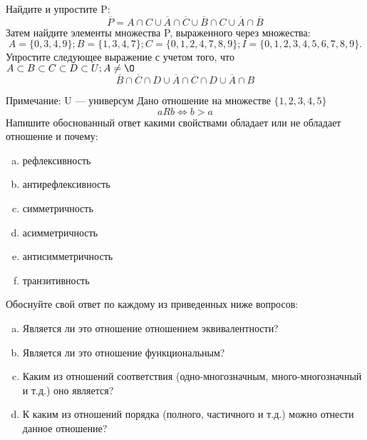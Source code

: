 \documentclass[10pt]{exam}
\begin{document}
\begin{questions}
\question
Найдите и упростите P:
\begin{equation*}
\overline{P} = A \cap C \cup \overline{A} \cap \overline{C} \cup \overline{B} \cap C \cup \overline{A} \cap \overline{B}
\end{equation*}
Затем найдите элементы множества P, выраженного через множества:
\begin{equation*}
A = \{0, 3, 4, 9\}; 
B = \{1, 3, 4, 7\};
C = \{0, 1, 2, 4, 7, 8, 9\};
I = \{0, 1, 2, 3, 4, 5, 6, 7, 8, 9\}.
\end{equation*}\question
Упростите следующее выражение с учетом того, что $A\subset B \subset C \subset D \subset U; A \neq \O$
\begin{equation*}
\overline{B} \cap \overline{C} \cap D \cup \overline{A} \cap \overline{C} \cap D \cup \overline{A} \cap B
\end{equation*}

Примечание: U — универсум\question
Дано отношение на множестве $\{1, 2, 3, 4, 5\}$ 
\begin{equation*}
aRb \iff b > a
\end{equation*}
Напишите обоснованный ответ какими свойствами обладает или не обладает отношение и почему:   
\begin{enumerate} [a)]\setcounter{enumi}{0}
\item рефлексивность
\item антирефлексивность
\item симметричность
\item асимметричность
\item антисимметричность
\item транзитивность
\end{enumerate}

Обоснуйте свой ответ по каждому из приведенных ниже вопросов:
\begin{enumerate} [a)]\setcounter{enumi}{0}
    \item Является ли это отношение отношением эквивалентности?
    \item Является ли это отношение функциональным?
    \item Каким из отношений соответствия (одно-многозначным, много-многозначный и т.д.) оно является?
    \item К каким из отношений порядка (полного, частичного и т.д.) можно отнести данное отношение?
\end{enumerate}


\end{questions}
\end{document}
